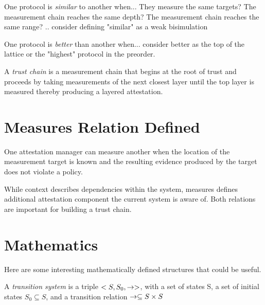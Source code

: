 \documentclass[12pt, letterpaper]{article}
\begin{document}
\begin{defn}[Similar] 
  One protocol is \emph{similar} to another when... They measure the same targets? The measurement chain reaches the same depth? The measurement chain reaches the same range? .. consider defining "similar" as a weak bisimulation
\end{defn}

\begin{defn}[Better] 
  One protocol is \emph{better} than another when... consider better as the top of the lattice or the "highest" protocol in the preorder. 
\end{defn}

\begin{defn}
  A \emph{trust chain} is a measurement chain that begins at the root of trust and proceeds by taking measurements of the next closest layer until the top layer is measured thereby producing a layered attestation. 
\end{defn}

\section{Measures Relation Defined}

\begin{defn}[Measures]
  One attestation manager can measure another when the location of the measurement target is known and the resulting evidence produced by the target does not violate a policy. 
\end{defn}

While context describes dependencies within the system, measures defines additional attestation component the current system is aware of. Both relations are important for building a trust chain. 

\section{Mathematics}

Here are some interesting mathematically defined structures that could be useful. 

\begin{defn}
  A \emph{transition system} is a triple $<S,S_0, \to>$, with a set of states S, a set of initial states $S_0 \subseteq S$, and a transition relation $\to \subseteq S \times S$ \cite{FRAP}
\end{defn}

\end{document}
